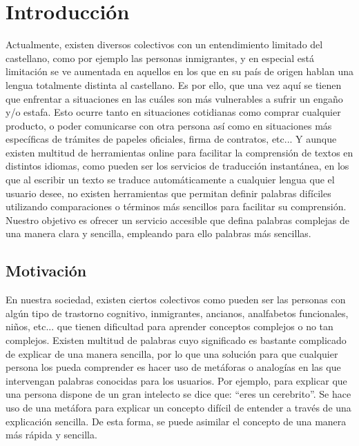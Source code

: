 \chapter{Introducción}
\label{cap:introduccion}

Actualmente, existen diversos colectivos con un entendimiento limitado del castellano, como por ejemplo las personas inmigrantes, y en especial está limitación se ve aumentada en aquellos en los que en su país de origen hablan una lengua totalmente distinta al castellano. Es por ello, que una vez aquí se tienen que enfrentar a situaciones en las cuáles son más vulnerables a sufrir un engaño y/o estafa. Esto ocurre tanto en situaciones cotidianas como comprar cualquier producto, o poder comunicarse con otra persona así como en situaciones más específicas de trámites de papeles oficiales, firma de contratos, etc... Y aunque existen multitud de herramientas online para facilitar la comprensión de textos en distintos idiomas, como pueden ser los servicios de traducción instantánea, en los que al escribir un texto se traduce automáticamente a cualquier lengua que el usuario desee, no existen herramientas que permitan definir palabras difíciles utilizando comparaciones o términos más sencillos para facilitar su comprensión. 
Nuestro objetivo es ofrecer un servicio accesible que defina palabras complejas de una manera clara y sencilla, empleando para ello palabras más sencillas.
 

	


\section{Motivación}
\label{cap:sec:motivacion}

En nuestra sociedad, existen ciertos colectivos como pueden ser las personas con algún tipo de trastorno cognitivo, inmigrantes, ancianos, analfabetos funcionales, niños, etc... que tienen dificultad para aprender conceptos complejos o no tan complejos. 
Existen multitud de palabras cuyo significado es bastante complicado de explicar de una manera sencilla, por lo que una solución para que cualquier persona los pueda comprender es hacer uso de metáforas o analogías en las que intervengan palabras conocidas para los usuarios. Por ejemplo, para explicar que una persona dispone de un gran intelecto se dice que: ``eres un cerebrito''. Se hace uso de una metáfora para explicar un concepto difícil de entender a través de una explicación sencilla. De esta forma, se puede asimilar el concepto de una manera más rápida y sencilla.

